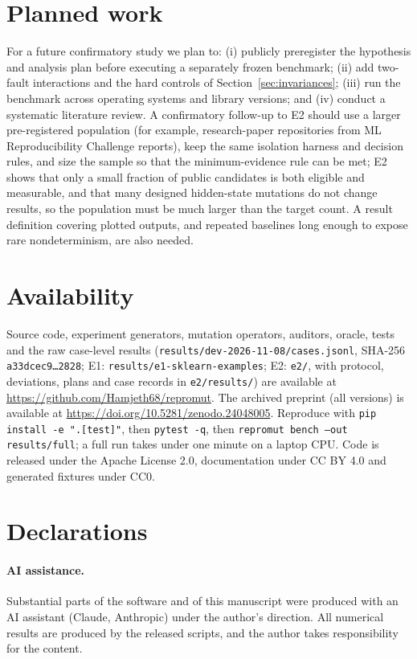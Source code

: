 \documentclass[11pt]{article}
\begin{document}
\section{Planned work}
\label{sec:future}
For a future confirmatory study we plan to: (i) publicly preregister the hypothesis and analysis plan before executing a separately frozen benchmark; (ii) add two-fault interactions and the hard controls of Section~\ref{sec:invariances}; (iii) run the benchmark across operating systems and library versions; and (iv) conduct a systematic literature review. A confirmatory follow-up to E2 should use a larger pre-registered population (for example, research-paper repositories from ML Reproducibility Challenge reports), keep the same isolation harness and decision rules, and size the sample so that the minimum-evidence rule can be met; E2 shows that only a small fraction of public candidates is both eligible and measurable, and that many designed hidden-state mutations do not change results, so the population must be much larger than the target count. A result definition covering plotted outputs, and repeated baselines long enough to expose rare nondeterminism, are also needed.

\section{Availability}
\label{sec:availability}
Source code, experiment generators, mutation operators, auditors, oracle, tests and the raw case-level results (\texttt{results/\allowbreak dev-2026-11-08/\allowbreak cases.jsonl}, SHA-256 \texttt{a33dcec9\ldots 2828}; E1: \texttt{results/\allowbreak e1-sklearn-\allowbreak examples}; E2: \texttt{e2/}, with protocol, deviations, plans and case records in \texttt{e2/results/}) are available at \url{https://github.com/Hamjeth68/repromut}. The archived preprint (all versions) is available at \url{https://doi.org/10.5281/zenodo.24048005}. Reproduce with \texttt{pip install -e ".[test]"}, then \texttt{pytest -q}, then \texttt{repromut bench --out results/full}; a full run takes under one minute on a laptop CPU. Code is released under the Apache License 2.0, documentation under CC BY 4.0 and generated fixtures under CC0.

\section*{Declarations}
\paragraph{AI assistance.} Substantial parts of the software and of this manuscript were produced with an AI assistant (Claude, Anthropic) under the author's direction. All numerical results are produced by the released scripts, and the author takes responsibility for the content.
\end{document}
